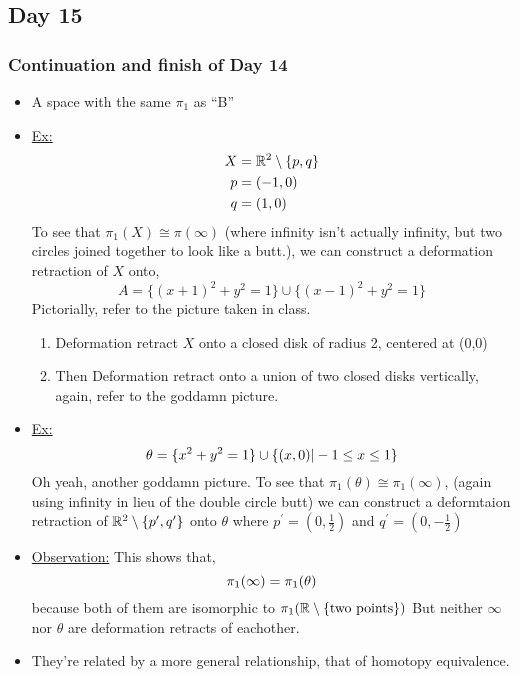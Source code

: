 \documentclass[../notes.tex]{subfiles}
\begin{document}
\subsection{Day 15}
\subsubsection{Continuation and finish of Day 14}
\begin{itemize}
    \item A space with the same $\pi_1$ as ``B''
    \item \underline{Ex:}
        \begin{align*}
            X &= \mathbb{R}^2\setminus\{p,q\}\\
            p &= (-1,0)\\
            q &= (1,0)\\
        \end{align*}
        To see that $\pi_1(X) \cong \pi(\infty)$ (where infinity isn't actually infinity,
        but two circles joined together to look like a butt.), we can construct a 
        deformation retraction of $X$ onto,
        \[
            A=\{(x+1)^2+y^2=1\}\cup \{(x-1)^2+y^2=1\}
        \]
        Pictorially, refer to the picture taken in class.
        \begin{enumerate}
            \item Deformation retract $X$ onto a closed disk of radius 2, centered
                at (0,0)
            \item Then Deformation retract onto a union of two closed disks vertically, 
                again, refer to the goddamn picture.
        \end{enumerate}
    \item
        \underline{Ex:}
        \[
            \theta=\{x^2+y^2=1\}\cup\{(x,0)| -1 \leq x \leq 1\}\\
        \]
        Oh yeah, another goddamn picture. To see that $\pi_1(\theta)\cong\pi_{1}(\infty)$,
        (again using infinity in lieu of the double circle butt)
        we can construct a deformtaion retraction of $\mathbb{R}^2\setminus\{p^{\prime},q^{\prime}\}$
        onto $\theta$ where $p^{\prime}=(0,\frac{1}{2})$ and $q^{\prime}=(0,-\frac{1}{2})$
    \item \underline{Observation:} This shows that,
        \[
            \pi_1(\infty)=\pi_1(\theta)\\
        \]
        because both of them are isomorphic to $\pi_1(\mathbb{R}\setminus\{\text{two points}\})$
        But neither $\infty$ nor $\theta$ are deformation retracts of eachother.
    \item They're related by a more general relationship, that of homotopy equivalence.
\end{itemize}
\end{document}
